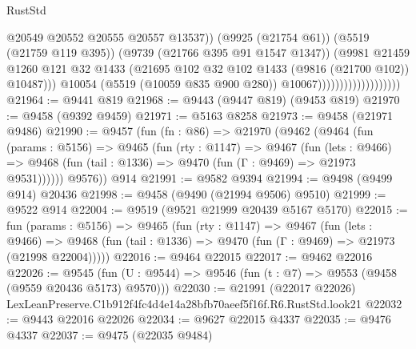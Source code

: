 \begin{lexlean}{RustStd}
\begin{coremodule}
                                                @20549
                                                @20552
                                                @20555
                                                @20557
                                                @13537))
                                            (@9925 (@21754 @61))
                                            (@5519 (@21759 @119 @395))
                                            (@9739 (@21766 @395 @91 @1547 @1347))
                                            (@9981
                                              @21459
                                              @1260
                                              @121
                                              @32
                                              @1433
                                              (@21695
                                                @102
                                                @32
                                                @102
                                                @1433
                                                (@9816 (@21700 @102))
                                                @10487)))
                                          @10054
                                          (@5519 (@10059 @835 @900 @280))
                                          @10067)))))))))))))))))))
@21964 := @9441 @819
@21968 := @9443 (@9447 @819) (@9453 @819)
@21970 := @9458 (@9392 @9459)
@21971 := @5163 @8258
@21973 := @9458 (@21971 @9486)
@21990 := @9457
    (fun (fn : @86) =>
    @21970
      (@9462
        (@9464
          (fun (params : @5156) =>
          @9465
            (fun (rty : @1147) =>
            @9467
              (fun (lets : @9466) =>
              @9468 (fun (tail : @1336) => @9470 (fun (Γ : @9469) => @21973 @9531))))))
        @9576))
    @914
@21991 := @9582 @9394
@21994 := @9498 (@9499 @914) @20436
@21998 := @9458 (@9490 (@21994 @9506) @9510)
@21999 := @9522 @914
@22004 := @9519 (@9521 @21999 @20439 @5167 @5170)
@22015 := fun (params : @5156) =>
  @9465
    (fun (rty : @1147) =>
    @9467
      (fun (lets : @9466) =>
      @9468 (fun (tail : @1336) => @9470 (fun (Γ : @9469) => @21973 (@21998 @22004)))))
@22016 := @9464 @22015
@22017 := @9462 @22016
@22026 := @9545
    (fun (U : @9544) => @9546 (fun (t : @7) => @9553 (@9458 (@9559 @20436 @5173) @9570)))
@22030 := @21991 (@22017 @22026) LexLeanPreserve.C1b912f4fc4d4e14a28bfb70aeef5f16f.R6.RustStd.look21
@22032 := @9443 @22016 @22026
@22034 := @9627 @22015 @4337
@22035 := @9476 @4337
@22037 := @9475 (@22035 @9484)

\end{coremodule}
\end{lexlean}
